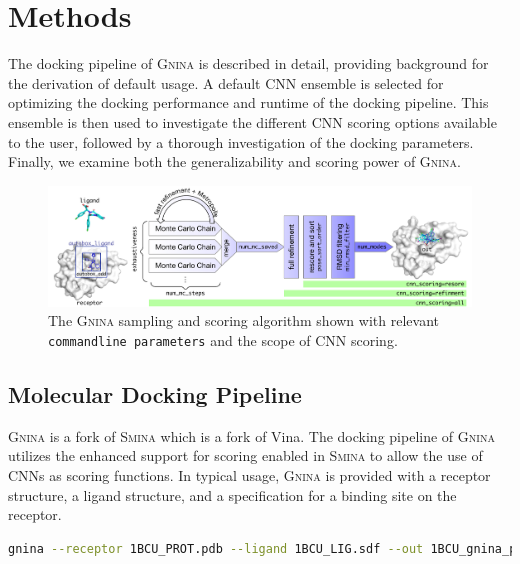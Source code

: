 \documentclass[journal=jcisd8,manuscript=article]{achemso}
\begin{document}
\section{Methods}

The docking pipeline of \textsc{Gnina} is described in detail, providing background for the derivation of default usage. A default CNN ensemble is selected for optimizing the docking performance and runtime of the docking pipeline. This ensemble is then used to investigate the different CNN scoring options available to the user, followed by a thorough investigation of the docking parameters. Finally, we examine both the generalizability and scoring power of \textsc{Gnina}.

\begin{figure}[htb]
    \centering
    \includegraphics[width=\linewidth]{figures/gnina}
    \caption{The \textsc{Gnina} sampling and scoring algorithm shown with relevant \texttt{commandline parameters} and the scope of CNN scoring.}
    \label{fig:workflow}
\end{figure}

\subsection{Molecular Docking Pipeline}
\textsc{\textsc{Gnina}} is a fork of \textsc{Smina}\cite{koes2013lessons} which is a fork of Vina\cite{trott2010autodock}. The docking pipeline of \textsc{\textsc{Gnina}} utilizes the enhanced support for scoring enabled in \textsc{Smina} to allow the use of CNNs as scoring functions. In typical usage, \textsc{\textsc{Gnina}} is provided with a receptor structure, a ligand structure, and a specification for a binding site on the receptor.

\begin{lstlisting}[title=Example Gnina Usage,label=code:Usage,language=bash]
    gnina --receptor 1BCU_PROT.pdb --ligand 1BCU_LIG.sdf --out 1BCU_gnina_poses.sdf.gz --autobox_ligand 1BCU_LIG.sdf --autobox_add 4 --cnn Crossdock_Default2018 Dense_3 --cnn_scoring rescore --exhaustiveness 8 --num_mc_saved 50 --cnn_rotation 0 --num_modes 9 --min_rmsd_filter 1
\end{lstlisting}
\end{document}
